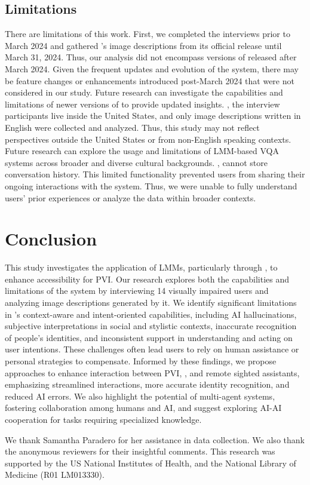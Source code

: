 \subsection{Limitations} 


There are  limitations of this work.
First, we completed the interviews prior to March 2024 and gathered \sbma's image descriptions from its official release until March 31, 2024. Thus, our analysis did not encompass versions of \bma{} released after March 2024. Given the frequent updates and evolution of the system, there may be feature changes or enhancements introduced post-March 2024 that were not considered in our study. Future research can investigate the capabilities and limitations of newer versions of \bma{} to provide updated insights.  
% 
% 
, the interview participants live inside the United States, and only image descriptions written in English were collected and analyzed. Thus, this study may not reflect perspectives outside the United States or from non-English speaking contexts. Future research can explore the usage and limitations of LMM-based VQA systems across broader and diverse cultural backgrounds. 
% 
, \bma{} cannot store conversation history. This limited functionality prevented users from sharing their ongoing interactions with the system. Thus, we were unable to fully understand users' prior experiences or analyze the data within broader contexts. 




\section{Conclusion}

This study investigates the application of LMMs, particularly through \bma, to enhance accessibility for PVI. Our research explores both the capabilities and limitations of the system by interviewing 14 visually impaired users and analyzing image descriptions generated by it. 
We identify significant limitations in \bma's context-aware and intent-oriented capabilities, including AI hallucinations, subjective interpretations in social and stylistic contexts, inaccurate recognition of people's identities, and inconsistent support in understanding and acting on user intentions. 
These challenges often lead users to rely on human assistance or personal strategies to compensate. 
Informed by these findings, we propose approaches to enhance interaction between PVI, \bma, and remote sighted assistants, emphasizing streamlined interactions, more accurate identity recognition, and reduced AI errors. We also highlight the potential of multi-agent systems, fostering collaboration among humans and AI, and suggest exploring AI-AI cooperation for tasks requiring specialized knowledge.


\begin{acks} 
We thank Samantha Paradero for her assistance in data collection.  
We also thank the anonymous reviewers for their insightful comments. 
This research was supported by the US National Institutes of Health, and the National Library of Medicine (R01 LM013330). 
\end{acks} 